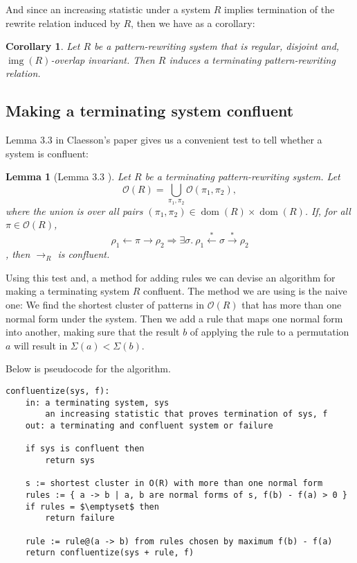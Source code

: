 \documentclass[a4paper, 11pt, english]{article}
\newtheorem{lemma}[theorem]{Lemma}
\newtheorem{corollary}[theorem]{Corollary}
\theoremstyle{definition}
\newcommand{\Ocal}{\mathcal{O}}
\newcommand{\from}{\leftarrow}
\newcommand{\tostar}{\stackrel{*}{\to}}
\newcommand{\fromstar}{\stackrel{*}{\from}}
\DeclareMathOperator{\dom}{dom}
\DeclareMathOperator{\img}{img}
\begin{document}
And since an increasing statistic under a system $R$ implies termination of the rewrite relation
induced by $R$, then we have as a corollary:

\begin{corollary}
    Let $R$ be a pattern-rewriting system that is regular, disjoint and, $\img(R)$-overlap invariant. 
    Then $R$ induces a terminating pattern-rewriting relation.
\end{corollary}

\subsection{Making a terminating system confluent}
Lemma $3.3$ in Claesson's paper gives us a convenient test to tell whether a system is
confluent:
\begin{lemma}[Lemma 3.3 \cite{claesson:2021}]
    Let $R$ be a terminating pattern-rewriting system. Let 
    \[
        \Ocal(R) = \bigcup_{\pi_1, \pi_2} \Ocal(\pi_1, \pi_2),
    \]
    where the union is over all pairs $(\pi_1, \pi_2) \in \dom(R) \times \dom(R)$. If, for all
    $\pi \in \Ocal(R)$,
    \[
        \rho_1 \from \pi \to \rho_2 \Longrightarrow \exists \sigma . \ \rho_1 \fromstar \sigma \tostar
        \rho_2 
    \],
    then $\to_R$ is confluent.
\end{lemma}
Using this test and, a method for adding rules we can devise an algorithm for making a terminating
system $R$ confluent. The method we are using is the
naive one: We find the shortest cluster of patterns in $\Ocal(R)$ that has more than one
normal form under the system. Then we add a rule that maps one normal form into another, making
sure that the result $b$ of applying the rule to a permutation $a$ will result in $\Sigma(a) <
\Sigma(b)$.

Below is pseudocode for the algorithm.

\lstset{basicstyle=\footnotesize\ttfamily, frame=single, breaklines=true,
mathescape=true}
\begin{minipage}{\linewidth}
\begin{lstlisting}[title={Algorithm 1}]
confluentize(sys, f):
    in: a terminating system, sys
        an increasing statistic that proves termination of sys, f
    out: a terminating and confluent system or failure

    if sys is confluent then
        return sys

    s := shortest cluster in O(R) with more than one normal form
    rules := { a -> b | a, b are normal forms of s, f(b) - f(a) > 0 }
    if rules = $\emptyset$ then
        return failure

    rule := rule@(a -> b) from rules chosen by maximum f(b) - f(a)
    return confluentize(sys + rule, f)
\end{lstlisting}
\end{minipage}
\end{document}
